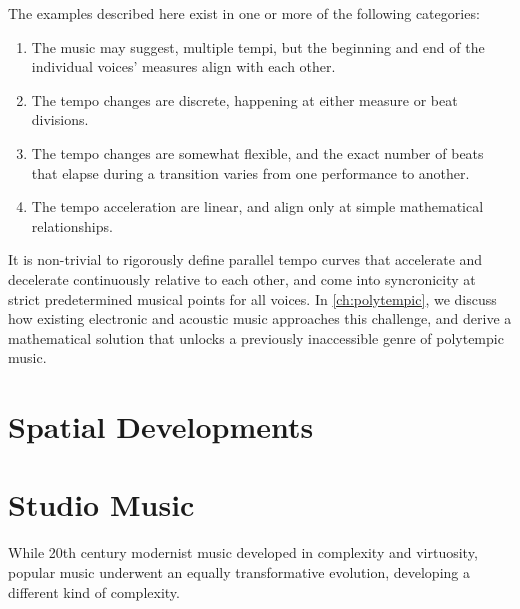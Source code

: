 The examples described here exist in one or more of the following
categories:
\begin{enumerate}
\item The music may suggest, multiple tempi, but the beginning and end
  of the individual voices' measures align with each other.
\item The tempo changes are discrete, happening at either measure
  or beat divisions.
\item The tempo changes are somewhat flexible, and  the exact number of
  beats that elapse during a transition varies from one performance to
  another.
\item The tempo acceleration are linear, and align only at simple
  mathematical relationships.
\end{enumerate}
It is non-trivial to rigorously define parallel tempo curves that
accelerate and decelerate continuously relative to each other, and
come into syncronicity at strict predetermined musical points for all
voices. In \autoref{ch:polytempic}, we discuss how existing electronic
and acoustic music approaches this challenge, and derive a
mathematical solution that unlocks a previously inaccessible genre of
polytempic music.

\section{Spatial Developments}
\label{sec:spatial-developments}


\section{Studio Music}
\label{sec:studio-music}
While 20th century modernist music developed in complexity and
virtuosity, popular music underwent an equally transformative
evolution, developing a different kind of complexity. 

